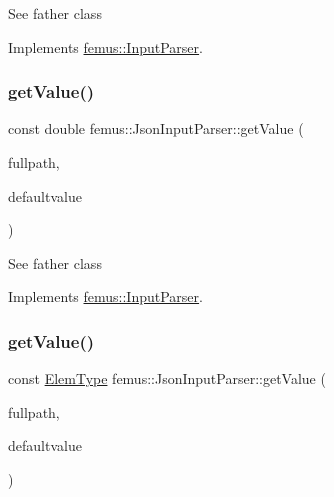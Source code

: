 See father class 

Implements \mbox{\hyperlink{classfemus_1_1_input_parser_ae178b5210e0a7df40b7eb78133cac13c}{femus\+::\+Input\+Parser}}.

\mbox{\label{classfemus_1_1_json_input_parser_a38b41ae56ab7b1b3780c4692d06cbd33}} 
\subsubsection{\texorpdfstring{get\+Value()}{getValue()}\hspace{0.1cm}{\footnotesize\ttfamily [2/6]}}
{\footnotesize\ttfamily const double femus\+::\+Json\+Input\+Parser\+::get\+Value (\begin{DoxyParamCaption}\item[{const std\+::string \&}]{fullpath,  }\item[{const double}]{defaultvalue }\end{DoxyParamCaption})\hspace{0.3cm}{\ttfamily [virtual]}}

See father class 

Implements \mbox{\hyperlink{classfemus_1_1_input_parser_ab7ff8e8528d6f9e7cc6f928f7020687e}{femus\+::\+Input\+Parser}}.

\mbox{\label{classfemus_1_1_json_input_parser_a00598393bac7b29e552167fb6d1c51f6}} 
\subsubsection{\texorpdfstring{get\+Value()}{getValue()}\hspace{0.1cm}{\footnotesize\ttfamily [3/6]}}
{\footnotesize\ttfamily const \mbox{\hyperlink{_elem_type_enum_8hpp_a1b014294b9757a001707c979e2bab627}{Elem\+Type}} femus\+::\+Json\+Input\+Parser\+::get\+Value (\begin{DoxyParamCaption}\item[{const std\+::string \&}]{fullpath,  }\item[{const \mbox{\hyperlink{_elem_type_enum_8hpp_a1b014294b9757a001707c979e2bab627}{Elem\+Type}}}]{defaultvalue }\end{DoxyParamCaption})\hspace{0.3cm}{\ttfamily [virtual]}}

